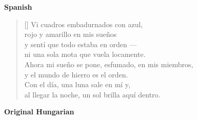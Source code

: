 \documentclass[a4paper,12pt,twoside,final]{book}
\begin{document}
\bigskip

\noindent \textbf{Spanish}


\settowidth{\versewidth}{Ahora mi sueño se pone, esfumado, en mis miembros,}

\begin{verse}[\versewidth]
  Vi cuadros embadurnados con azul, \\
  rojo y amarillo en mis sueños \\
  y sentí que todo estaba en orden --- \\
  ni una sola mota que vuela locamente. \\
  Ahora mi sueño se pone, esfumado, en mis miembros, \\
  y el mundo de hierro es el orden. \\
  Con el día, una luna sale en mí y, \\
  al llegar la noche, un sol brilla aquí dentro. \\
\end{verse}

\newpage


\noindent \textbf{Original Hungarian}



\settowidth{\versewidth}{Nappal hold kél bennem s ha kinn van}
\end{document}
